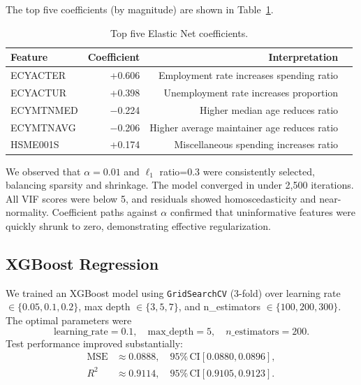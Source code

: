\documentclass{article}
\begin{document}
The top five coefficients (by magnitude) are shown in Table~\ref{tab:en_coefs}.
\begin{table}[ht]
  \centering
  \begin{tabular}{lrrp{5cm}}
    \toprule
    Feature & Coefficient & Interpretation \\
    \midrule
    ECYACTER     & +0.606 & Employment rate increases spending ratio \\
    ECYACTUR     & +0.398 & Unemployment rate increases proportion \\
    ECYMTNMED    & $-$0.224 & Higher median age reduces ratio \\
    ECYMTNAVG    & $-$0.206 & Higher average maintainer age reduces ratio \\
    HSME001S     & +0.174 & Miscellaneous spending increases ratio \\
    \bottomrule
  \end{tabular}
  \caption{Top five Elastic Net coefficients.}
  \label{tab:en_coefs}
\end{table}

We observed that $\alpha=0.01$ and $\ell_1$ ratio=0.3 were consistently selected, balancing sparsity and shrinkage. The model converged in under 2,500 iterations. All VIF scores were below 5, and residuals showed homoscedasticity and near-normality. Coefficient paths against $\alpha$ confirmed that uninformative features were quickly shrunk to zero, demonstrating effective regularization.

\subsection{XGBoost Regression}
We trained an XGBoost model using \texttt{GridSearchCV} (3-fold) over learning rate $\in\{0.05,0.1,0.2\}$, max depth $\in\{3,5,7\}$, and n\_estimators $\in\{100,200,300\}$. The optimal parameters were
\[
  \text{learning\_rate}=0.1,
  \quad \text{max\_depth}=5,
  \quad n\_\mathrm{estimators}=200.
\]
Test performance improved substantially:
\begin{align*}
  \mathrm{MSE} &\approx 0.0888, \quad 95\%\,\mathrm{CI}[0.0880,0.0896], \\
  R^2 &\approx 0.9114, \quad 95\%\,\mathrm{CI}[0.9105,0.9123].
\end{align*}
\end{document}
